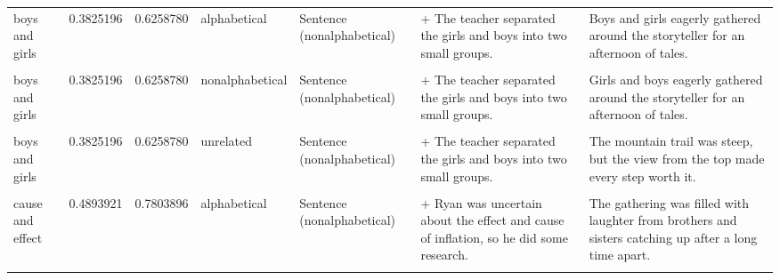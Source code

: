 \documentclass[
  12pt,
]{scrartcl}
\begin{document}
\begin{landscape}
\begin{longtable}{lrrllll}
boys and girls & 0.3825196 & 0.6258780 & alphabetical & Sentence (nonalphabetical) & + The teacher separated the girls and boys into two small groups. & Boys and girls eagerly gathered around the storyteller for an afternoon of tales.\\
\cellcolor{gray!6}{boys and girls} & \cellcolor{gray!6}{0.3825196} & \cellcolor{gray!6}{0.6258780} & \cellcolor{gray!6}{nonalphabetical} & \cellcolor{gray!6}{Sentence (alphabetical)} & \cellcolor{gray!6}{+ The teacher separated the boys and girls into two small groups.} & \cellcolor{gray!6}{Girls and boys eagerly gathered around the storyteller for an afternoon of tales.}\\
\addlinespace
boys and girls & 0.3825196 & 0.6258780 & nonalphabetical & Sentence (nonalphabetical) & + The teacher separated the girls and boys into two small groups. & Girls and boys eagerly gathered around the storyteller for an afternoon of tales.\\
\cellcolor{gray!6}{boys and girls} & \cellcolor{gray!6}{0.3825196} & \cellcolor{gray!6}{0.6258780} & \cellcolor{gray!6}{unrelated} & \cellcolor{gray!6}{Sentence (alphabetical)} & \cellcolor{gray!6}{+ The teacher separated the boys and girls into two small groups.} & \cellcolor{gray!6}{The mountain trail was steep, but the view from the top made every step worth it.}\\
boys and girls & 0.3825196 & 0.6258780 & unrelated & Sentence (nonalphabetical) & + The teacher separated the girls and boys into two small groups. & The mountain trail was steep, but the view from the top made every step worth it.\\
\cellcolor{gray!6}{cause and effect} & \cellcolor{gray!6}{0.4893921} & \cellcolor{gray!6}{0.7803896} & \cellcolor{gray!6}{alphabetical} & \cellcolor{gray!6}{Sentence (alphabetical)} & \cellcolor{gray!6}{+ Ryan was uncertain about the cause and effect of inflation, so he did some research.} & \cellcolor{gray!6}{The gathering was filled with laughter from brothers and sisters catching up after a long time apart.}\\
cause and effect & 0.4893921 & 0.7803896 & alphabetical & Sentence (nonalphabetical) & + Ryan was uncertain about the effect and cause of inflation, so he did some research. & The gathering was filled with laughter from brothers and sisters catching up after a long time apart.\\
\addlinespace
\cellcolor{gray!6}{cause and effect} & \cellcolor{gray!6}{0.4893921} & \cellcolor{gray!6}{0.7803896} & \cellcolor{gray!6}{nonalphabetical} & \cellcolor{gray!6}{Sentence (alphabetical)} & \cellcolor{gray!6}{+ Ryan was uncertain about the cause and effect of inflation, so he did some research.} & \cellcolor{gray!6}{The gathering was filled with laughter from sisters and brothers catching up after a long time apart.}\\

\end{longtable}
\end{landscape}
\end{document}
